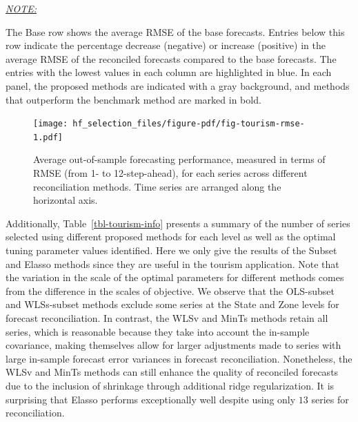 \documentclass[
  12pt,
  11pt]{article}
\begin{document}
\begin{table}[!h]
{\begin{threeparttable}
\begin{tabular}{lrrrrrrrrrrrrrrrrrrrr}
\bottomrule
\end{tabular}
\begin{tablenotes}[para]
\item \underline{\textit{NOTE:}} 
\item The Base row shows the average RMSE of the base forecasts. Entries below this row indicate the percentage decrease (negative) or increase (positive) in the average RMSE of the reconciled forecasts compared to the base forecasts. The entries with the lowest values in each column are highlighted in blue. In each panel, the proposed methods are indicated with a gray background, and methods that outperform the benchmark method are marked in bold.
\end{tablenotes}
\end{threeparttable}}
\end{table}

\begin{figure}[!htb]

{\centering \texttt{[image: hf\_selection\_files/figure-pdf/fig-tourism-rmse-1.pdf]}

}

\caption{\label{fig-tourism-rmse}Average out-of-sample forecasting
performance, measured in terms of RMSE (from 1- to 12-step-ahead), for
each series across different reconciliation methods. Time series are
arranged along the horizontal axis.}

\end{figure}

Additionally, Table~\ref{tbl-tourism-info} presents a summary of the
number of series selected using different proposed methods for each
level as well as the optimal tuning parameter values identified. Here we
only give the results of the Subset and Elasso methods since they are
useful in the tourism application. Note that the variation in the scale
of the optimal parameters for different methods comes from the
difference in the scales of objective. We observe that the OLS-subset
and WLSs-subset methods exclude some series at the State and Zone levels
for forecast reconciliation. In contrast, the WLSv and MinTs methods
retain all series, which is reasonable because they take into account
the in-sample covariance, making themselves allow for larger adjustments
made to series with large in-sample forecast error variances in forecast
reconciliation. Nonetheless, the WLSv and MinTs methods can still
enhance the quality of reconciled forecasts due to the inclusion of
shrinkage through additional ridge regularization. It is surprising that
Elasso performs exceptionally well despite using only \(13\) series for
reconciliation.
\end{document}
